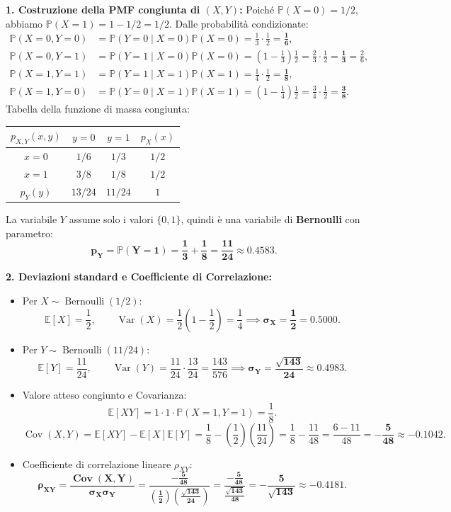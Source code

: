\documentclass[11pt,a4paper]{article}
\newcommand{\EE}{\mathbb{E}}
\newcommand{\Prob}{\mathbb{P}}
\newcommand{\Var}{\operatorname{Var}}
\newcommand{\Cov}{\operatorname{Cov}}
\begin{document}
\begin{soluzionebox}
\textbf{1. Costruzione della PMF congiunta di $(X,Y)$:}
Poiché $\Prob(X=0) = 1/2$, abbiamo $\Prob(X=1) = 1 - 1/2 = 1/2$.
Dalle probabilità condizionate:
\begin{align*}
\Prob(X=0, Y=0) &= \Prob(Y=0 \mid X=0)\Prob(X=0) = \frac{1}{3} \cdot \frac{1}{2} = \bm{\frac{1}{6}}, \\
\Prob(X=0, Y=1) &= \Prob(Y=1 \mid X=0)\Prob(X=0) = \left(1 - \frac{1}{3}\right) \frac{1}{2} = \frac{2}{3} \cdot \frac{1}{2} = \bm{\frac{1}{3}} = \frac{2}{6}, \\
\Prob(X=1, Y=1) &= \Prob(Y=1 \mid X=1)\Prob(X=1) = \frac{1}{4} \cdot \frac{1}{2} = \bm{\frac{1}{8}}, \\
\Prob(X=1, Y=0) &= \Prob(Y=0 \mid X=1)\Prob(X=1) = \left(1 - \frac{1}{4}\right) \frac{1}{2} = \frac{3}{4} \cdot \frac{1}{2} = \bm{\frac{3}{8}}.
\end{align*}
Tabella della funzione di massa congiunta:
\begin{center}
\begin{tabular}{c|cc|c}
\toprule
$p_{X,Y}(x,y)$ & $y = 0$ & $y = 1$ & $p_X(x)$ \\
\midrule
$x = 0$ & $1/6$ & $1/3$ & $1/2$ \\
$x = 1$ & $3/8$ & $1/8$ & $1/2$ \\
\midrule
$p_Y(y)$ & $13/24$ & $11/24$ & $1$ \\
\bottomrule
\end{tabular}
\end{center}
La variabile $Y$ assume solo i valori $\{0, 1\}$, quindi è una variabile di \textbf{Bernoulli} con parametro:
\[
\mathbf{p_Y = \Prob(Y = 1) = \frac{1}{3} + \frac{1}{8} = \frac{11}{24} \approx 0.4583}.
\]

\textbf{2. Deviazioni standard e Coefficiente di Correlazione:}
\begin{itemize}
    \item Per $X \sim \operatorname{Bernoulli}(1/2)$:
    \[
    \EE[X] = \frac{1}{2}, \qquad \Var(X) = \frac{1}{2}\left(1 - \frac{1}{2}\right) = \frac{1}{4} \implies \mathbf{\sigma_X = \frac{1}{2} = 0.5000}.
    \]
    \item Per $Y \sim \operatorname{Bernoulli}(11/24)$:
    \[
    \EE[Y] = \frac{11}{24}, \qquad \Var(Y) = \frac{11}{24} \cdot \frac{13}{24} = \frac{143}{576} \implies \mathbf{\sigma_Y = \frac{\sqrt{143}}{24} \approx 0.4983}.
    \]
    \item Valore atteso congiunto e Covarianza:
    \[
    \EE[XY] = 1 \cdot 1 \cdot \Prob(X=1, Y=1) = \frac{1}{8}.
    \]
    \[
    \Cov(X,Y) = \EE[XY] - \EE[X]\EE[Y] = \frac{1}{8} - \left(\frac{1}{2}\right)\left(\frac{11}{24}\right) = \frac{1}{8} - \frac{11}{48} = \frac{6 - 11}{48} = -\mathbf{\frac{5}{48}} \approx -\mathbf{0.1042}.
    \]
    \item Coefficiente di correlazione lineare $\rho_{XY}$:
    \[
    \mathbf{\rho_{XY} = \frac{\Cov(X,Y)}{\sigma_X \sigma_Y} = \frac{-\frac{5}{48}}{\left(\frac{1}{2}\right)\left(\frac{\sqrt{143}}{24}\right)} = \frac{-\frac{5}{48}}{\frac{\sqrt{143}}{48}} = -\frac{5}{\sqrt{143}} \approx -0.4181}.
    \]
\end{itemize}


\end{soluzionebox}
\end{document}
